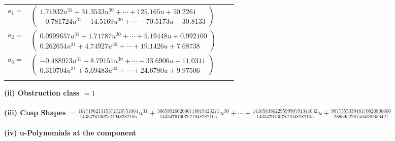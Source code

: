 \documentclass[1p]{elsarticle_modified}
\theoremstyle{definition}
\begin{document}
\begin{tabular}{m{7pt} m{180pt} m{7pt} m{180pt} }
\flushright $a_{1}=$&$\begin{pmatrix}1.71932 u^{31}+31.3533 u^{30}+\cdots+125.165 u+50.2261\\-0.781724 u^{31}-14.5169 u^{30}+\cdots-70.5173 u-30.8133\end{pmatrix}$ \\
\flushright $a_{2}=$&$\begin{pmatrix}0.0999657 u^{31}+1.71787 u^{30}+\cdots+5.19448 u+0.992100\\0.262654 u^{31}+4.74927 u^{30}+\cdots+19.1426 u+7.68738\end{pmatrix}$ \\
\flushright $a_{6}=$&$\begin{pmatrix}-0.488973 u^{31}-8.79151 u^{30}+\cdots-33.6906 u-11.0311\\0.310704 u^{31}+5.69483 u^{30}+\cdots+24.6780 u+9.97506\end{pmatrix}$\\&\end{tabular}
\flushleft \textbf{(ii) Obstruction class $= 1$}\\~\\
\flushleft \textbf{(iii) Cusp Shapes $= \frac{167719621315372726751064}{14334761307521948282105} u^{31}+\frac{3065892602606718019423271}{14334761307521948282105} u^{30}+\cdots+\frac{14165838622959990791344032}{14334761307521948282105} u+\frac{907755503948170820806660}{2866952261504389656421}$}\\~\\
\newpage\renewcommand{\arraystretch}{1}
\flushleft \textbf{(iv) u-Polynomials at the component}\newline \\
\end{document}
